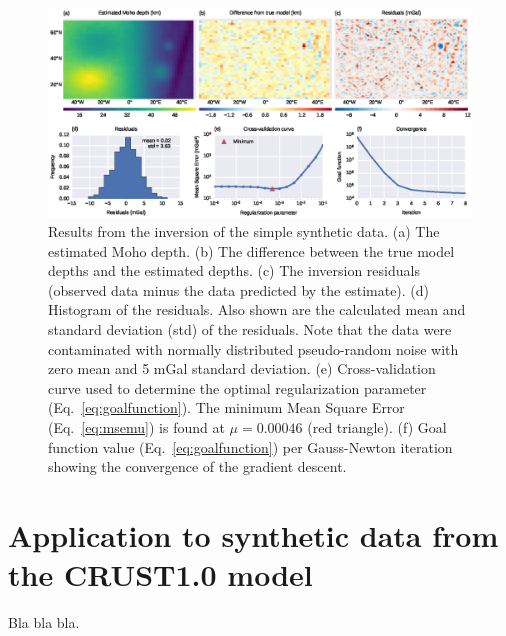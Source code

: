 \documentclass[extra,mreferee]{gji}
\begin{document}
\begin{figure}
    \centering
    \includegraphics[width=\textwidth]{figures/synthetic-simple-results}
    \caption{
        Results from the inversion of the simple synthetic data.
        (a) The estimated Moho depth.
        (b) The difference between the true model depths
        and the estimated depths.
        (c) The inversion residuals (observed data minus
        the data predicted by the estimate).
        (d) Histogram of the residuals. Also shown are the calculated
        mean and standard deviation (std) of the residuals.
        Note that the data were contaminated with normally distributed
        pseudo-random noise with zero mean and 5 mGal standard deviation.
        (e) Cross-validation curve used to determine the optimal regularization
        parameter (Eq.~\ref{eq:goalfunction}).
        The minimum Mean Square Error (Eq.~\ref{eq:msemu}) is found at
        $\mu = 0.00046$ (red triangle).
        (f) Goal function value (Eq.~\ref{eq:goalfunction}) per Gauss-Newton
        iteration showing the convergence of the gradient descent.
    }
    \label{fig:simple-results}
\end{figure}



\section{Application to synthetic data from the CRUST1.0 model}

Bla bla bla.
\end{document}
